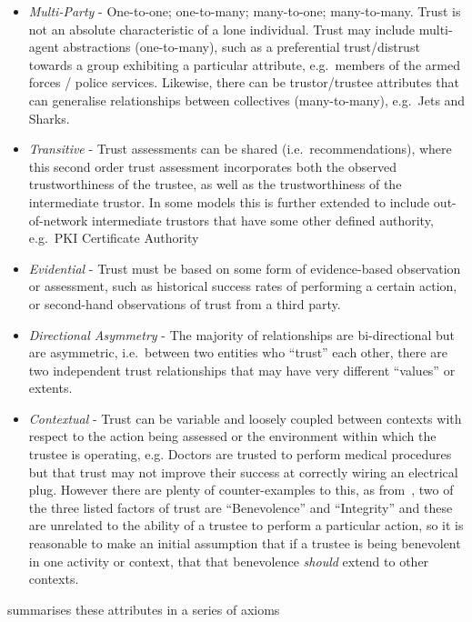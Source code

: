 \begin{itemize}
	\item \emph{Multi-Party} - One-to-one; one-to-many; many-to-one; many-to-many.
	Trust is not an absolute characteristic of a lone individual.
	Trust may include multi-agent abstractions (one-to-many), such as a preferential trust/distrust towards a group exhibiting a particular attribute, e.g.\ members of the armed forces / police services.
	Likewise, there can be trustor/trustee attributes that can generalise relationships between collectives (many-to-many), e.g.\ Jets and Sharks\cite{Robbins1961}.
	\item \emph{Transitive} - Trust assessments can be shared (i.e.\ recommendations), where this second order trust assessment incorporates both the observed trustworthiness of the trustee, as well as the trustworthiness of the intermediate trustor.
	In some models this is further extended to include out-of-network intermediate trustors that have some other defined authority, e.g.\ PKI Certificate Authority
	\item \emph{Evidential} - Trust must be based on some form of evidence-based observation or assessment, such as historical success rates of performing a certain action, or second-hand observations of trust from a third party.
	\item \emph{Directional Asymmetry} - The majority of relationships are bi-directional but are asymmetric, i.e.\ between two entities who ``trust'' each other, there are two independent trust relationships that may have very different ``values'' or extents.
	\item \emph{Contextual} - Trust can be variable and loosely coupled between contexts with respect to the action being assessed or the environment within which the trustee is operating, e.g.
	Doctors are trusted to perform medical procedures but that trust may not improve their success at correctly wiring an electrical plug.
	However there are plenty of counter-examples to this, as from~\cite{Mayer1995}, two of the three listed factors of trust are ``Benevolence'' and ``Integrity'' and these are unrelated to the ability of a trustee to perform a particular action, so it is reasonable to make an initial assumption that if a trustee is being benevolent in one activity or context, that that benevolence \emph{should} extend to other contexts.
\end{itemize}

\cite{Liu2010} summarises these attributes in a series of axioms 

